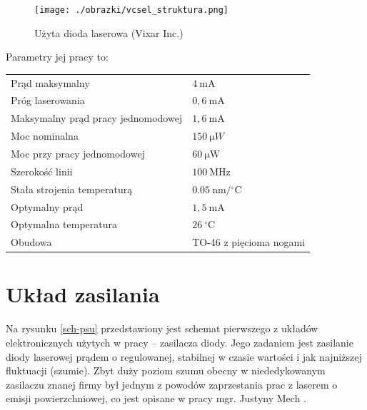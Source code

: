 \documentclass[a4paper,10pt,twoside]{report}
\begin{document}
\begin{figure}[h!]
\begin{center}
 \texttt{[image: ./obrazki/vcsel\_struktura.png]}
\end{center}
\caption{Użyta dioda laserowa (Vixar Inc.)}
\label{struktura}
\end{figure}


Parametry jej pracy to:
\begin{center}
\begin{tabular}{ll}
Prąd maksymalny & $4 ~\mathrm{mA}$\\
Próg laserowania & $0{,}6~\mathrm{mA}$\\
Maksymalny prąd pracy jednomodowej & $1{,}6~\mathrm{mA}$\\
Moc nominalna & $150~\mathrm{\mu }W$\\
Moc przy pracy jednomodowej & $60~\mathrm{\mu W}$\\
Szerokość linii & $100~\mathrm{MHz}$\\
Stała strojenia temperaturą & $0.05 ~\mathrm{nm/{}^{\circ}C}$\\
Optymalny prąd & $1{,}5 ~\mathrm{mA}$\\
Optymalna temperatura & $26~\mathrm{ {}^{\circ}C}$ \\
Obudowa & TO-46 z pięcioma nogami
\end{tabular}
\end{center}


\section{Układ zasilania}

Na rysunku \ref{sch-psu} przedstawiony jest schemat pierwszego z układów elektronicznych użytych w pracy -- zasilacza diody. Jego zadaniem jest zasilanie diody laserowej prądem o regulowanej, stabilnej w czasie wartości i jak najniższej fluktuacji (szumie). Zbyt duży poziom szumu obecny w niededykowanym zasilaczu znanej firmy był jednym z powodów zaprzestania prac z laserem o emisji powierzchniowej, co jest opisane w pracy mgr. Justyny Mech \cite{mgrJustynaMech}.
\end{document}
